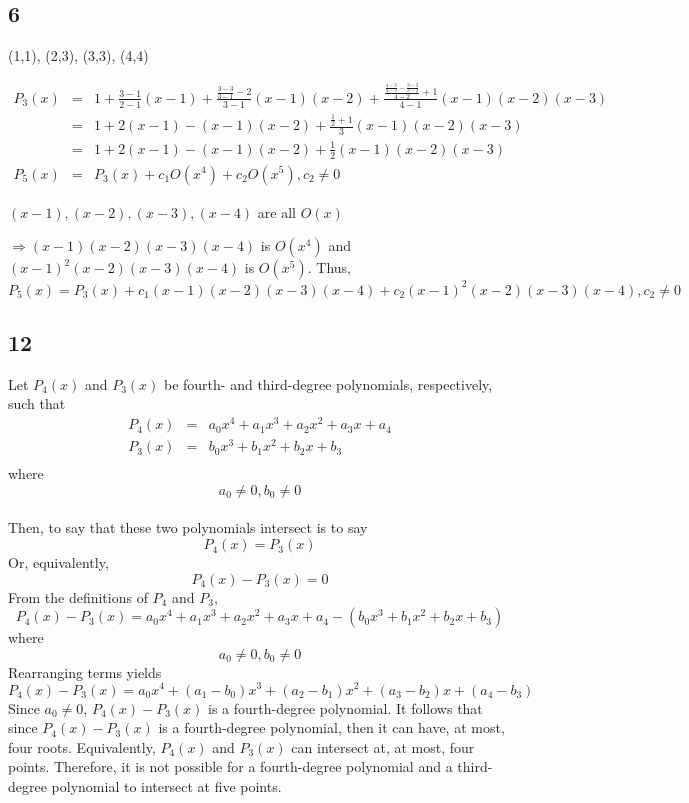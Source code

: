 \documentclass[12pt]{article}
\begin{document}
\subsection*{6}
(1,1), (2,3), (3,3), (4,4)

\begin{eqnarray*}
  P_3(x) & = & 1 + \frac{3-1}{2-1}(x-1) + \frac{\frac{3-3}{3-1} - 2}{3-1}(x-1)(x-2) + \frac{\frac{\frac{4-3}{4-3} - \frac{3-3}{3-2}}{4-2} + 1}{4-1}(x-1)(x-2)(x-3)\\
  & = & 1 + 2(x-1) - (x-1)(x-2) + \frac{\frac{1}{2} + 1}{3}(x-1)(x-2)(x-3)\\
  & = & 1 + 2(x-1) - (x-1)(x-2) + \frac{1}{2}(x-1)(x-2)(x-3)\\
  P_5(x) & = &  P_3(x) + c_1O(x^4) + c_2O(x^5), c_2 \neq 0
\end{eqnarray*}

\((x-1), (x-2), (x-3), (x-4)\) are all \(O(x)\)


\(\Rightarrow (x-1)(x-2)(x-3)(x-4)\) is \( O(x^4)\) and \((x-1)^2(x-2)(x-3)(x-4)\) is \(O(x^5)\). Thus,
\[P_5(x) = P_3(x) + c_1(x-1)(x-2)(x-3)(x-4) + c_2(x-1)^2(x-2)(x-3)(x-4), c_2 \neq 0\]

\subsection*{12}
Let \(P_4(x)\) and \(P_3(x)\) be fourth- and third-degree polynomials, respectively, such that
\begin{eqnarray*}
P_4(x) & = & a_0x^4 + a_1x^3 + a_2x^2 + a_3x + a_4\\
P_3(x) & = & b_0x^3 + b_1x^2 + b_2x + b_3\\
\end{eqnarray*}
where \[a_0 \neq 0, b_0 \neq 0\]\\

Then, to say that these two polynomials intersect is to say
\[P_4(x) = P_3(x)\]  
Or, equivalently, \[P_4(x) - P_3(x) = 0\]  From the definitions of \(P_4\) and \(P_3\), 
\[P_4(x) - P_3(x) = a_0x^4 + a_1x^3 + a_2x^2 + a_3x + a_4 - (b_0x^3 + b_1x^2 + b_2x + b_3)\]
where 
\[a_0 \neq 0, b_0 \neq 0\]
Rearranging terms yields
\[P_4(x) - P_3(x) = a_0x^4 + (a_1 - b_0)x^3 + (a_2 - b_1)x^2 + (a_3 - b_2)x + (a_4- b_3)\]
Since \(a_0 \neq 0\), \(P_4(x) - P_3(x)\) is a fourth-degree polynomial.  
It follows that since \(P_4(x) - P_3(x)\) is a fourth-degree polynomial, then it can have, at most, four roots.
Equivalently, \(P_4(x)\) and \(P_3(x)\) can intersect at, at most, four points.  
Therefore, it is not possible for a fourth-degree polynomial and a third-degree polynomial to intersect at five points.
\end{document}
